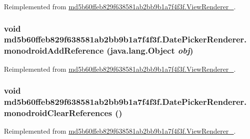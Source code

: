 Reimplemented from \hyperlink{classmd5b60ffeb829f638581ab2bb9b1a7f4f3f_1_1_view_renderer__2_a0898cf56fa9a49b653470eaf1608e77}{md5b60ffeb829f638581ab2bb9b1a7f4f3f.ViewRenderer\_}.\hypertarget{classmd5b60ffeb829f638581ab2bb9b1a7f4f3f_1_1_date_picker_renderer_3beb2afa3ed98862669dcc1fe7d6307c}{
\subsubsection[{monodroidAddReference}]{\setlength{\rightskip}{0pt plus 5cm}void md5b60ffeb829f638581ab2bb9b1a7f4f3f.DatePickerRenderer.monodroidAddReference (java.lang.Object {\em obj})}}
\label{classmd5b60ffeb829f638581ab2bb9b1a7f4f3f_1_1_date_picker_renderer_3beb2afa3ed98862669dcc1fe7d6307c}




Reimplemented from \hyperlink{classmd5b60ffeb829f638581ab2bb9b1a7f4f3f_1_1_view_renderer__2_64ca8244a89f60a47c173d9c0b15d610}{md5b60ffeb829f638581ab2bb9b1a7f4f3f.ViewRenderer\_}.\hypertarget{classmd5b60ffeb829f638581ab2bb9b1a7f4f3f_1_1_date_picker_renderer_272024ba18637be81cb9cd68055ccc07}{
\subsubsection[{monodroidClearReferences}]{\setlength{\rightskip}{0pt plus 5cm}void md5b60ffeb829f638581ab2bb9b1a7f4f3f.DatePickerRenderer.monodroidClearReferences ()}}
\label{classmd5b60ffeb829f638581ab2bb9b1a7f4f3f_1_1_date_picker_renderer_272024ba18637be81cb9cd68055ccc07}




Reimplemented from \hyperlink{classmd5b60ffeb829f638581ab2bb9b1a7f4f3f_1_1_view_renderer__2_dae20979ac761a65aa60c9b427509c37}{md5b60ffeb829f638581ab2bb9b1a7f4f3f.ViewRenderer\_}.

